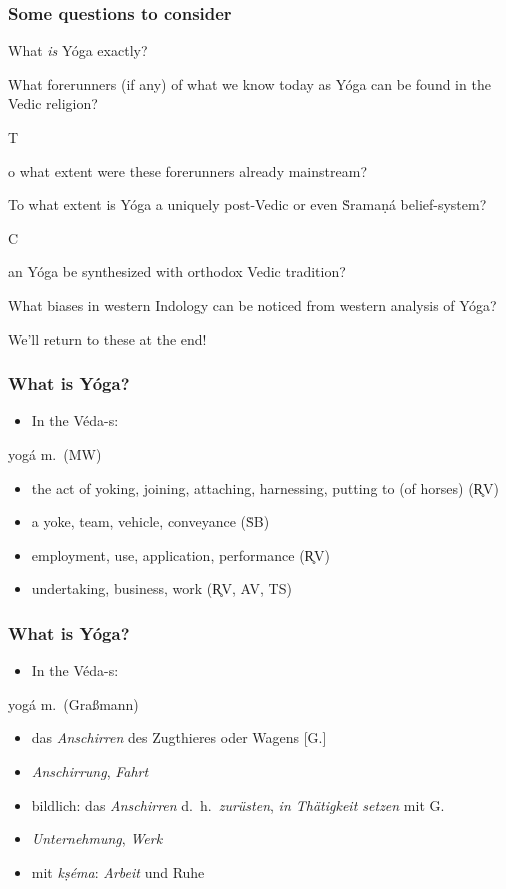 \documentclass[pdf]{beamer}
\newcommand{\Subitem}[1]{{\setlength\itemindent{12pt} \item[-] #1}}
\begin{document}
\begin{frame}[label=questions] \frametitle{Some questions to consider}
\begin{itemize}
	\item What \emph{is} Yóga exactly?
	\item What forerunners (if any) of what we know today as Yóga can be found in the Vedic religion?
	\Subitem To what extent were these forerunners already mainstream?
	\item To what extent is Yóga a uniquely post-Vedic or even Ṡramaṇá belief-system?
	\Subitem Can Yóga be synthesized with orthodox Vedic tradition?
	\item What biases in western Indology can be noticed from western analysis of Yóga?
	\item We'll return to these at the end!
\end{itemize}
\end{frame}

\begin{frame} \frametitle{What is Yóga?}
\begin{itemize}
	\item In the Véda-s:
\end{itemize}
 
\begin{block} {yogá m.~(MW)}
\begin{itemize}
	\item the act of yoking, joining, attaching, harnessing, putting to (of horses) (R̥V)
	\item a yoke, team, vehicle, conveyance (ṠB)
	\item employment, use, application, performance (R̥V)
	\item undertaking, business, work (R̥V, AV, TS)
\end{itemize}
\end{block}
\end{frame}

\begin{frame} \frametitle{What is Yóga?}
\begin{itemize}
	\item In the Véda-s:
\end{itemize}

\begin{block} {yogá m.~(Graßmann)}
\begin{itemize}
	\item das \emph{Anschirren} des Zugthieres oder Wagens [G.]
	\item \emph{Anschirrung}, \emph{Fahrt}
	\item bildlich: das \emph{Anschirren} d.~h.~\emph{zurüsten}, \emph{in Thätigkeit setzen} mit G.
	\item \emph{Unternehmung}, \emph{Werk}
	\item mit \textit{kṣéma}: \emph{Arbeit} und Ruhe
\end{itemize}
\end{block}
\end{frame}
\end{document}
